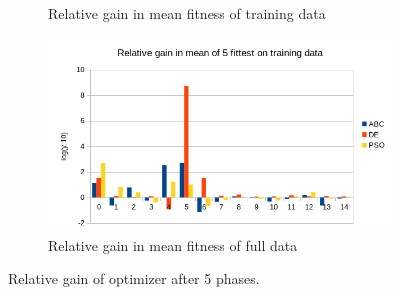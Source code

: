 \begin{figure}
\begin{subfigure}{0.6\textwidth}
        \caption{Relative gain in mean fitness of training data}
    \end{subfigure}%
    \begin{subfigure}{0.6\textwidth}
    \centering
        \includegraphics[width=0.8\linewidth]{figures/hybrid_phases5_meanfullfitness.png}
        \caption{Relative gain in mean fitness of full data}
    \end{subfigure}
    \caption{Relative gain of optimizer after 5 phases.}
    \label{fig:5phase}
    \end{figure}

